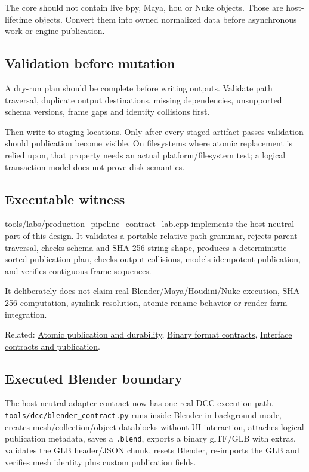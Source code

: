 The core should not contain live bpy, Maya, hou or Nuke objects. Those are host-lifetime objects. Convert them into owned normalized data before asynchronous work or engine publication.

\subsection{Validation before mutation}\label{appendix-03ade9e1875f-validation-before-mutation}

A dry-run plan should be complete before writing outputs. Validate path traversal, duplicate output destinations, missing dependencies, unsupported schema versions, frame gaps and identity collisions first.

Then write to staging locations. Only after every staged artifact passes validation should publication become visible. On filesystems where atomic replacement is relied upon, that property needs an actual platform/filesystem test; a logical transaction model does not prove disk semantics.

\subsection{Executable witness}\label{appendix-03ade9e1875f-executable-witness}

tools/labs/production\_pipeline\_contract\_lab.cpp implements the host-neutral part of this design. It validates a portable relative-path grammar, rejects parent traversal, checks schema and SHA-256 string shape, produces a deterministic sorted publication plan, checks output collisions, models idempotent publication, and verifies contiguous frame sequences.

It deliberately does not claim real Blender/Maya/Houdini/Nuke execution, SHA-256 computation, symlink resolution, atomic rename behavior or render-farm integration.

Related: \hyperref[appendix-e89a8f290ef5]{Atomic publication and durability}, \hyperref[appendix-590bbb2424c1]{Binary format contracts}, \hyperref[appendix-fdae7ff0a23f]{Interface contracts and publication}.

\subsection{Executed Blender boundary}\label{appendix-03ade9e1875f-executed-blender-boundary}

The host-neutral adapter contract now has one real DCC execution path. \texttt{tools/dcc/blender\_contract.py} runs inside Blender in background mode, creates mesh/collection/object datablocks without UI interaction, attaches logical publication metadata, saves a \texttt{.blend}, exports a binary glTF/GLB with extras, validates the GLB header/JSON chunk, resets Blender, re-imports the GLB and verifies mesh identity plus custom publication fields.

